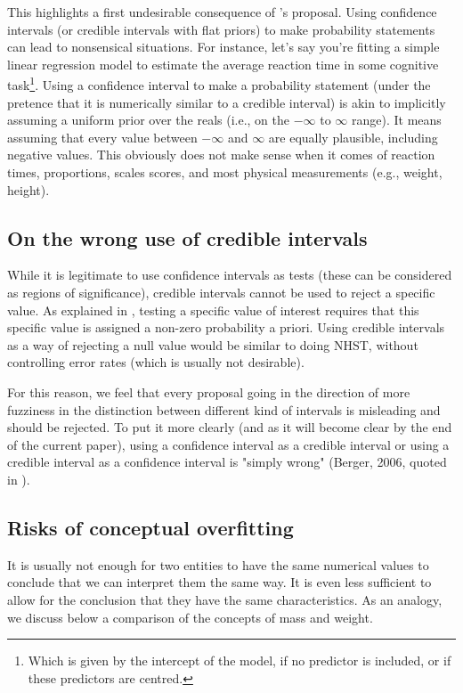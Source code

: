 \documentclass[a4paper,man,natbib,floatsintext,donotrepeattitle]{apa6}
\begin{document}
 This highlights a first undesirable consequence of \cite{albers_credible_2018}'s proposal. Using confidence intervals (or credible intervals with flat priors) to make probability statements can lead to nonsensical situations. For instance, let's say you're fitting a simple linear regression model to estimate the average reaction time in some cognitive task\footnote{Which is given by the intercept of the model, if no predictor is included, or if these predictors are centred.}. Using a confidence interval to make a probability statement (under the pretence that it is numerically similar to a credible interval) is akin to implicitly assuming a uniform prior over the reals (i.e., on the $-\infty$ to $\infty$ range). It means assuming that every value between $-\infty$ and $\infty$ are equally plausible, including negative values. This obviously does not make sense when it comes of reaction times, proportions, scales scores, and most physical measurements (e.g., weight, height).

\subsection{On the wrong use of credible intervals}

While it is legitimate to use confidence intervals as tests (these can be considered as regions of significance), credible intervals cannot be used to reject a specific value. As explained in \cite{morey_fallacy_2015}, testing a specific value of interest requires that this specific value is assigned a non-zero probability a priori. Using credible intervals as a way of rejecting a null value would be similar to doing NHST, without controlling error rates (which is usually not desirable).

For this reason, we feel that every proposal going in the direction of more fuzziness in the distinction between different kind of intervals is misleading and should be rejected. To put it more clearly (and as it will become clear by the end of the current paper), using a confidence interval as a credible interval or using a credible interval as a confidence interval is "simply wrong" (Berger, 2006, quoted in \citealp{morey_fallacy_2015}).

\subsection{Risks of conceptual overfitting}

It is usually not enough for two entities to have the same numerical values to conclude that we can interpret them the same way. It is even less sufficient to allow for the conclusion that they have the same characteristics. As an analogy, we discuss below a comparison of the concepts of mass and weight.
\end{document}
